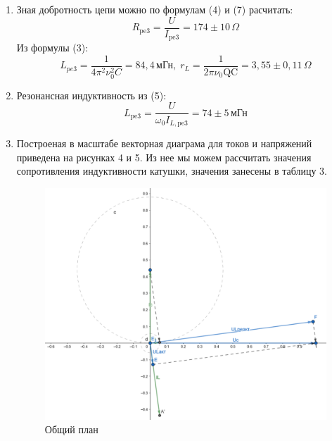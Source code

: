 \documentclass[a4paper, 12pt]{article}
\begin{document}
\begin{enumerate}
    \item Зная добротность цепи можно по формулам (4) и (7) расчитать:
 \begin{displaymath}R_{\mathrm{pe3}}=\frac{U}{I_{\mathrm{pe3}}}= 174 \pm 10 \, \Omega\end{displaymath}
    \iteml Из формулы (3): \begin{displaymath} L_{p e3}=\frac{1}{4 \pi^{2} \nu^{2}_{0} C}= 84,4 \, \text{мГн}, \;  r_{L}=\frac{1}{2 \pi \nu_{0} \mathrm{QC}} = 3,55 \pm 0,11 \, \Omega \end{displaymath}
    \item Резонансная индуктивность из (5): \begin{displaymath}L_{ \mathrm{pe} 3}=\frac{U}{\omega_{0}I_{L, \mathrm{pe} 3}} =74 \pm 5 \, \text{мГн}\end{displaymath}
    \item Построеная в масштабе векторная диаграма для токов и напряжений приведена на рисунках 4 и 5. Из нее мы можем рассчитать значения сопротивления индуктивности катушки, значения занесены в таблицу 3.
    \begin{figure}[h]
\begin{center}
\begin{minipage}[h]{0.49\linewidth}
\includegraphics[width=1\linewidth]{Большой.png}
\caption{Общий план} %
\label{ris:experimoriginal} %
\end{minipage}
\hfill
\begin{minipage}[h]{0.49\linewidth}

\end{minipage}
\end{center}
\end{figure}
\end{enumerate}
\end{document}
